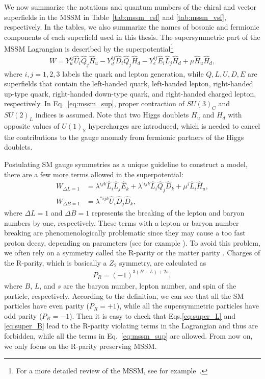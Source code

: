 \documentclass[12pt,twoside,book]{article}
\begin{document}
We now summarize the notations and quantum numbers of the chiral and vector superfields in the MSSM in Table~\ref{tab:mssm_csf} and \ref{tab:mssm_vsf}, respectively.
In the tables, we also summarize the names of bosonic and fermionic components of each superfield used in this thesis.
The supersymmetric part of the MSSM Lagrangian is described by the superpotential\footnote
{
  For a more detailed review of the MSSM, see for example~\cite{Martin:1997ns}.
}
\begin{align}
  W = Y_u^{i j} \hat{U}_i \hat{Q}_j \hat{H}_u - Y_d^{i j} \hat{D}_i \hat{Q}_j \hat{H}_d
  - Y_e^{i j} \hat{E}_i \hat{L}_j \hat{H}_d + \mu \hat{H}_u \hat{H}_d,
  \label{eq:mssm_sup}
\end{align}
where $i,j=1,2,3$ labels the quark and lepton generation, while $Q, L, U, D, E$ are superfields that contain the left-handed quark, left-handed lepton, right-handed up-type quark, right-handed down-type quark, and right-handed charged lepton, respectively.
In Eq.~\eqref{eq:mssm_sup}, proper contraction of $SU(3)_C$ and $SU(2)_L$ indices is assumed.
Note that two Higgs doublets $H_u$ and $H_d$ with opposite values of $U(1)_Y$ hypercharges are introduced, which is needed to cancel the contributions to the gauge anomaly from fermionic partners of the Higgs doublets.

Postulating SM gauge symmetries as a unique guideline to construct a model, there are a few more terms allowed in the superpotential:
\begin{align}
  W_{\Delta L=1} &= \lambda^{ijk} \hat{L}_i \hat{L}_j \hat{E}_k + \lambda^{'ijk} \hat{L}_i \hat{Q}_j \hat{D}_k
  + \mu^i \hat{L}_i \hat{H}_u, \label{eq:super_L} \\
  W_{\Delta B=1} &= \lambda^{''ijk} \hat{U}_i \hat{D}_j \hat{D}_k, \label{eq:super_B}
\end{align}
where $\Delta L=1$ and $\Delta B=1$ represents the breaking of the lepton and baryon numbers by one, respectively.
These terms with a lepton or baryon number breaking are phenomenologically problematic since they may cause a too fast proton decay, depending on parameters (see for example \cite{Sakai:1981pk}).
To avoid this problem, we often rely on a symmetry called the R-parity \cite{Farrar:1978xj} or the matter parity \cite{Dimopoulos:1981zb, Weinberg:1981wj, Sakai:1981pk, Dimopoulos:1981yj}.
Charges of the R-parity, which is basically a $Z_2$ symmetry, are calculated as
\begin{align}
  P_R = (-1)^{3(B-L)+2s},
\end{align}
where $B$, $L$, and $s$ are the baryon number, lepton number, and spin of the particle, respectively.
According to the definition, we can see that all the SM particles have even parity ($P_R = +1$), while all the supersymmetric particles have odd parity ($P_R = -1$).
Then it is easy to check that Eqs.\eqref{eq:super_L} and \eqref{eq:super_B} lead to the R-parity violating terms in the Lagrangian and thus are forbidden, while all the terms in Eq.~\eqref{eq:mssm_sup} are allowed.
From now on, we only focus on the R-parity preserving MSSM.
\end{document}
